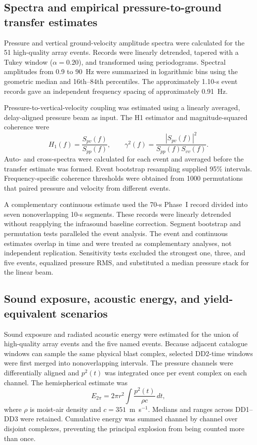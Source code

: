 \documentclass[]{seismica}
\begin{document}
\subsection{Spectra and empirical pressure-to-ground transfer estimates}

Pressure and vertical ground-velocity amplitude spectra were calculated for the
51 high-quality array events. Records were linearly detrended, tapered with a
Tukey window ($\alpha=0.20$), and transformed using periodograms. Spectral
amplitudes from 0.9 to 90~Hz were summarized in logarithmic bins using the
geometric median and 16th--84th percentiles. The approximately 1.10-s event
records gave an independent frequency spacing of approximately 0.91~Hz.

Pressure-to-vertical-velocity coupling was estimated using a linearly averaged,
delay-aligned pressure beam as input. The H1 estimator and magnitude-squared
coherence were
\begin{equation}
  H_1(f)=\frac{S_{pv}(f)}{S_{pp}(f)}, \qquad
  \gamma^2(f)=\frac{|S_{pv}(f)|^2}{S_{pp}(f)S_{vv}(f)}.
  \label{eq:h1_transfer}
\end{equation}
Auto- and cross-spectra were calculated for each event and averaged before the
transfer estimate was formed. Event bootstrap resampling supplied 95\%
intervals. Frequency-specific coherence thresholds were obtained from 1000
permutations that paired pressure and velocity from different events.

A complementary continuous estimate used the 70-s Phase~I record divided into
seven nonoverlapping 10-s segments. These records were linearly detrended
without reapplying the infrasound baseline correction. Segment bootstrap and
permutation tests paralleled the event analysis. The event and continuous
estimates overlap in time and were treated as complementary analyses, not
independent replication. Sensitivity tests excluded the strongest one, three,
and five events, equalized pressure RMS, and substituted a median pressure
stack for the linear beam.

\subsection{Sound exposure, acoustic energy, and yield-equivalent scenarios}

Sound exposure and radiated acoustic energy were estimated for the union of
high-quality array events and the five named events. Because adjacent catalogue
windows can sample the same physical blast complex, selected DD2-time windows
were first merged into nonoverlapping intervals. The pressure channels were
differentially aligned and $p^2(t)$ was integrated once per event complex on
each channel. The hemispherical estimate was
\begin{equation}
  E_{2\pi}=2\pi r^2\int\frac{p^2(t)}{\rho c}\,dt,
  \label{eq:acoustic_energy}
\end{equation}
where $\rho$ is moist-air density and $c=351$~m~s$^{-1}$. Medians and ranges
across DD1--DD3 were retained. Cumulative energy was summed channel by channel
over disjoint complexes, preventing the principal explosion from being counted
more than once.
\end{document}
